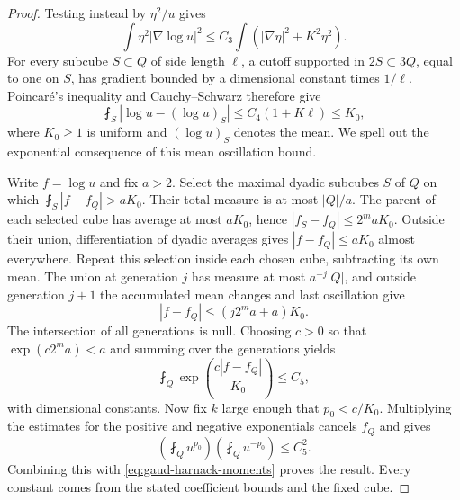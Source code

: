 \begin{proof}
Testing instead by $\eta^2/u$ gives
\[
 \int\eta^2|\nabla\log u|^2
       \leq C_3\int(|\nabla\eta|^2+K^2\eta^2).
\]
For every subcube $S\subset Q$ of side length $\ell$, a cutoff supported in $2S\subset3Q$, equal to one on $S$, has gradient bounded by a dimensional constant times $1/\ell$. Poincar\'e's inequality and Cauchy--Schwarz therefore give
\[
 \fint_S|\log u-(\log u)_S|
 \leq C_4(1+K\ell)\leq K_0,
\]
where $K_0\geq1$ is uniform and $(\log u)_S$ denotes the mean. We spell out the exponential consequence of this mean oscillation bound.

Write $f=\log u$ and fix $a>2$. Select the maximal dyadic subcubes $S$ of $Q$ on which $\fint_S|f-f_Q|>aK_0$. Their total measure is at most $|Q|/a$. The parent of each selected cube has average at most $aK_0$, hence $|f_S-f_Q|\leq2^maK_0$. Outside their union, differentiation of dyadic averages gives $|f-f_Q|\leq aK_0$ almost everywhere. Repeat this selection inside each chosen cube, subtracting its own mean. The union at generation $j$ has measure at most $a^{-j}|Q|$, and outside generation $j+1$ the accumulated mean changes and last oscillation give
\[
 |f-f_Q|\leq (j2^ma+a)K_0.
\]
The intersection of all generations is null. Choosing $c>0$ so that $\exp(c2^ma)<a$ and summing over the generations yields
\[
 \fint_Q\exp\!\left(\frac{c|f-f_Q|}{K_0}\right)\leq C_5,
\]
with dimensional constants. Now fix $k$ large enough that $p_0<c/K_0$. Multiplying the estimates for the positive and negative exponentials cancels $f_Q$ and gives
\[
 \left(\fint_Q u^{p_0}\right)
 \left(\fint_Q u^{-p_0}\right)\leq C_5^2.
\]
Combining this with \eqref{eq:gaud-harnack-moments} proves the result. Every constant comes from the stated coefficient bounds and the fixed cube.
\end{proof}

